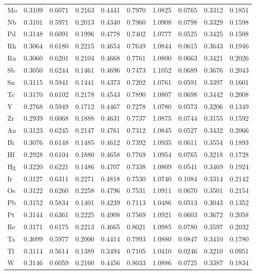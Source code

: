 \begin{table}[htbp]
{\begin{tabular}{l *{9}{l}}
      Mo & 0.3109 & 0.6071 & 0.2163 & 0.4441 & 0.7970 & 1.0825 & 0.0765 & 0.3312 & 0.1851 \\
      Nb & 0.3101 & 0.5971 & 0.2013 & 0.4340 & 0.7960 & 1.0908 & 0.0798 & 0.3329 & 0.1598 \\
      Pd & 0.3148 & 0.6091 & 0.1996 & 0.4778 & 0.7402 & 1.0777 & 0.0525 & 0.3425 & 0.1508 \\
      Rh & 0.3064 & 0.6180 & 0.2215 & 0.4654 & 0.7649 & 1.0844 & 0.0615 & 0.3643 & 0.1946 \\
      Ru & 0.3060 & 0.6201 & 0.2104 & 0.4668 & 0.7761 & 1.0800 & 0.0663 & 0.3421 & 0.2026 \\
      Sb & 0.3050 & 0.6244 & 0.1461 & 0.4696 & 0.7473 & 1.1052 & 0.0689 & 0.3676 & 0.2043 \\
      Sn & 0.3115 & 0.5941 & 0.1441 & 0.4373 & 0.7202 & 1.0761 & 0.0591 & 0.3397 & 0.1601 \\
      Tc & 0.3170 & 0.6102 & 0.2178 & 0.4543 & 0.7890 & 1.0807 & 0.0698 & 0.3442 & 0.2008 \\
      Y  & 0.2768 & 0.5949 & 0.1712 & 0.4467 & 0.7278 & 1.0780 & 0.0573 & 0.3206 & 0.1349 \\
      Zr & 0.2939 & 0.6068 & 0.1888 & 0.4631 & 0.7737 & 1.0875 & 0.0744 & 0.3155 & 0.1592 \\
      Au & 0.3123 & 0.6245 & 0.2147 & 0.4761 & 0.7312 & 1.0845 & 0.0527 & 0.3432 & 0.2066 \\
      Bi & 0.3076 & 0.6148 & 0.1485 & 0.4612 & 0.7392 & 1.0935 & 0.0611 & 0.3554 & 0.1893 \\
      Hf & 0.2928 & 0.6104 & 0.1880 & 0.4658 & 0.7769 & 1.0954 & 0.0765 & 0.3218 & 0.1728 \\
      Hg & 0.3220 & 0.6221 & 0.1486 & 0.4707 & 0.7338 & 1.0809 & 0.0541 & 0.3469 & 0.1924 \\
      Ir & 0.3127 & 0.6311 & 0.2271 & 0.4818 & 0.7530 & 1.0740 & 0.1084 & 0.3314 & 0.2142 \\
      Os & 0.3122 & 0.6260 & 0.2258 & 0.4796 & 0.7531 & 1.0911 & 0.0670 & 0.3501 & 0.2154 \\
      Pb & 0.3152 & 0.5834 & 0.1401 & 0.4239 & 0.7113 & 1.0486 & 0.0513 & 0.3043 & 0.1352 \\
      Pt & 0.3144 & 0.6361 & 0.2225 & 0.4908 & 0.7569 & 1.0921 & 0.0603 & 0.3672 & 0.2058 \\
      Re & 0.3171 & 0.6175 & 0.2213 & 0.4665 & 0.8021 & 1.0985 & 0.0780 & 0.3597 & 0.2032 \\
      Ta & 0.3099 & 0.5977 & 0.2000 & 0.4414 & 0.7993 & 1.0880 & 0.0847 & 0.3410 & 0.1780 \\
      Tl & 0.3114 & 0.5614 & 0.1389 & 0.3494 & 0.7105 & 1.0410 & 0.0246 & 0.3210 & 0.0951 \\
      W  & 0.3146 & 0.6059 & 0.2160 & 0.4456 & 0.8033 & 1.0886 & 0.0725 & 0.3387 & 0.1834 \\
      \bottomrule
    \end{tabular}
  }
\end{table}

